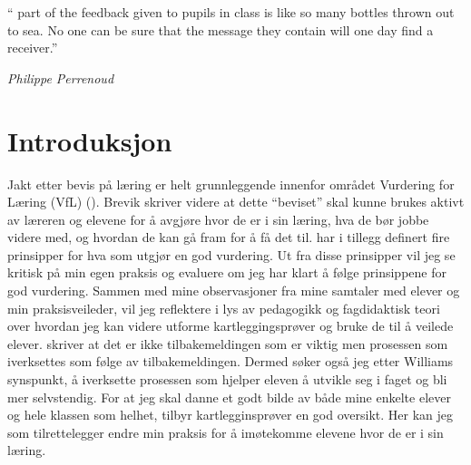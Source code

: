 \documentclass[main.tex]{subfiles}
\begin{document}
\setlength{\epigraphwidth}{0.8\textwidth}
\epigraph{``\textelp{} part of the feedback given to pupils in class is like so many 
bottles thrown out to sea. No one can be sure that the message they contain will one day 
find a receiver.''}
{\textit{Philippe Perrenoud}}

\section*{Introduksjon}
Jakt etter bevis på læring er helt grunnleggende innenfor området Vurdering for Læring (VfL)
(). Brevik skriver videre at dette ``beviset'' skal kunne brukes aktivt
av læreren og elevene for å avgjøre hvor de er i sin læring, hva de bør jobbe videre med, og
hvordan de kan gå fram for å få det til.  har i tillegg definert fire
prinsipper for hva som utgjør en god vurdering. Ut fra disse prinsipper vil jeg se kritisk på min
egen praksis og evaluere om jeg har klart å følge prinsippene for god vurdering. Sammen med
mine observasjoner fra mine samtaler med elever og min praksisveileder, vil jeg reflektere i lys
av pedagogikk og fagdidaktisk teori over hvordan jeg kan videre utforme kartleggingsprøver og bruke de til å veilede
elever.  skriver at det er ikke 
tilbakemeldingen som er viktig men prosessen som iverksettes som følge av tilbakemeldingen. Dermed søker
også jeg etter Williams synspunkt, å iverksette prosessen som hjelper eleven å utvikle seg i faget 
og bli mer selvstendig. For at jeg skal danne et godt bilde av både mine enkelte elever og hele klassen som
helhet, tilbyr kartlegginsprøver en god oversikt. Her kan jeg som tilrettelegger endre min praksis for å
imøtekomme elevene hvor de er i sin læring.
\newline
\end{document}
